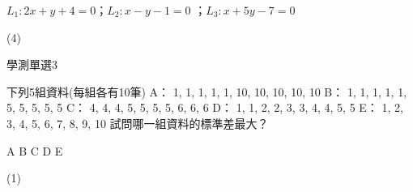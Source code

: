 \begin{QUESTIONS}
\begin{QUESTION}
\begin{QBODY}
\begin{QOPS}
                \QOP $L_1:2x+y+4=0$；$L_2:x-y-1=0$ ；$L_3:x+5y-7=0$
            \end{QOPS}
        \end{QBODY}
        \begin{QFROMS}
        \end{QFROMS}
        \begin{QTAGS}\end{QTAGS}
        \begin{QANS}
			(4)
        \end{QANS}
        \begin{QSOLLIST}
        \end{QSOLLIST}
        \begin{QEMPTYSPACE}
        \end{QEMPTYSPACE}
    \end{QUESTION}
    \begin{QUESTION}
        \begin{ExamInfo}{89}{學測}{單選}{3}
        \end{ExamInfo}
        \begin{ExamAnsRateInfo}{}{}{}{}
        \end{ExamAnsRateInfo}
        \begin{QBODY}
            下列5組資料(每組各有10筆)
            A：	1,	1,	1,	1,	1,	10,	10,	10,	10,	10
            B：	1,	1,	1,	1,	1,	5,	5,	5,	5,	5
            C：	4,	4,	4,	5,	5,	5,	5,	6,	6,	6
            D：	1,	1,	2,	2,	3,	3,	4,	4,	5,	5
            E：	1,	2,	3,	4,	5,	6,	7,	8,	9,	10
            試問哪一組資料的標準差最大？
            \begin{QOPS}
                \QOP A	
                \QOP B
                \QOP C	
                \QOP D
                \QOP E               
            \end{QOPS}
        \end{QBODY}
        \begin{QFROMS}
        \end{QFROMS}
        \begin{QTAGS}\end{QTAGS}
        \begin{QANS}
			(1)
        \end{QANS}
        \begin{QSOLLIST}
        \end{QSOLLIST}
        \begin{QEMPTYSPACE}
        \end{QEMPTYSPACE}
    \end{QUESTION}

\end{QUESTIONS}
